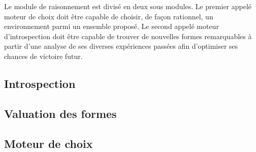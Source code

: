 
Le module de raisonnement est divisé en deux sous modules. Le premier appelé \og moteur de choix \fg{} doit être capable de choisir, de façon rationnel, un environnement parmi un ensemble proposé. Le second appelé \og moteur d'introspection \fg{} doit être capable de trouver de nouvelles formes remarquables à partir d'une analyse de ses diverses expériences passées afin d'optimiser ses chances de victoire futur.


\subsection{Introspection}



\subsection{Valuation des formes}



\subsection{Moteur de choix}



